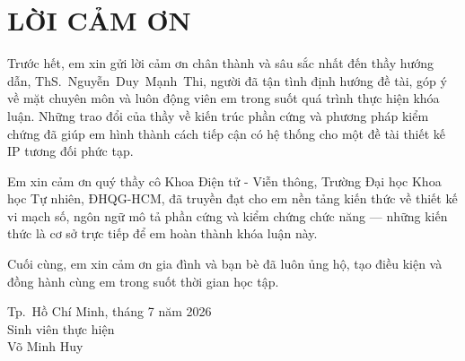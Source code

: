 \chapter*{LỜI CẢM ƠN}

Trước hết, em xin gửi lời cảm ơn chân thành và sâu sắc nhất đến thầy hướng dẫn,
ThS.~Nguyễn~Duy~Mạnh~Thi, người đã tận tình định hướng đề tài, góp ý về mặt chuyên môn
và luôn động viên em trong suốt quá trình thực hiện khóa luận. Những trao đổi của thầy về
kiến trúc phần cứng và phương pháp kiểm chứng đã giúp em hình thành cách tiếp cận có hệ thống
cho một đề tài thiết kế IP tương đối phức tạp.

Em xin cảm ơn quý thầy cô Khoa Điện tử - Viễn thông, Trường Đại học Khoa học Tự nhiên,
ĐHQG-HCM, đã truyền đạt cho em nền tảng kiến thức về thiết kế vi mạch số, ngôn ngữ mô tả
phần cứng và kiểm chứng chức năng — những kiến thức là cơ sở trực tiếp để em hoàn thành
khóa luận này.

Cuối cùng, em xin cảm ơn gia đình và bạn bè đã luôn ủng hộ, tạo điều kiện và đồng hành
cùng em trong suốt thời gian học tập.

\vspace{1cm}
\begin{flushright}
Tp.~Hồ Chí Minh, tháng 7 năm 2026\\
Sinh viên thực hiện\\[1.5cm]
Võ Minh Huy
\end{flushright}
